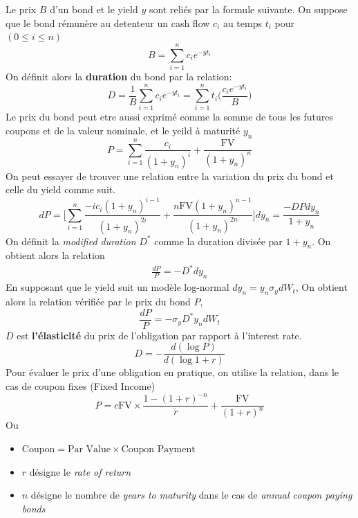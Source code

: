 \documentclass[a4paper]{article}
\begin{document}
Le prix $B$ d'un bond et le yield $y$ sont reliés par la formule suivante. On suppose que le bond rémunère au detenteur un cash flow $c_i$ au temps $t_i$ pour $(0\leq i\leq n)$
\begin{equation}
    B = \sum_{i=1}^{n} c_i e^{-yt_i}
\end{equation}
On définit alors la \textbf{duration} du bond par la relation:
\begin{equation}
    D = \frac{1}{B} \sum_{i=1}^{n} c_i e^{-y t_i} = \sum_{i=1}^{n} t_i \bigg( \frac{ c_i e^{-y t_i} }{B}\bigg)
\end{equation}
Le prix du bond peut etre aussi exprimé comme la somme de tous les futures coupons et de la valeur nominale, et le yeild à maturité $y_n$
\begin{equation}
    P = \sum_{i=1}^{n} \frac{c_i}{(1+y_n)^i}+\frac{\text{FV}}{(1+y_n)^n}
\end{equation}
On peut essayer de trouver une relation entre la variation du prix du bond et celle du yield comme suit.
\begin{equation}
    dP = \bigg[ \sum_{i=1}^{n} \frac{-ic_i(1+y_n)^{i-1}}{(1+y_n)^{2i}}+\frac{n \text{FV}(1+y_n)^{n-1}}{(1+y_n)^{2n}} \bigg]dy_n = \frac{-D P dy_n}{1+y_n}
\end{equation}
On définit la \textit{modified duration} $D^*$ comme la duration divisée par $1+y_n$. On obtient alors la relation 
\begin{align*}
    \frac{dP}{P} = -D^* dy_n
\end{align*}
En supposant que le yield suit un modèle log-normal $dy_n = y_n \sigma_y dW_t$, On obtient alors la relation vérifiée par le prix du bond $P$,
\begin{equation*}
    \frac{dP}{P} = - \sigma_y D^* y_n dW_t
\end{equation*}
$D$ est \textbf{l'élasticité} du prix de l'obligation par rapport à l'interest rate.
\begin{equation*}
    D = -\frac{d(\log P)}{d(\log 1+r)}
\end{equation*}
Pour évaluer le prix d'une obligation en pratique, on utilise la relation, dans le cas de coupon fixes (Fixed Income)
\begin{equation}
    \boxed{P = c \text{FV} \times \frac{1-(1+r)^{-n}}{r} + \frac{\text{FV}}{(1+r)^n}}
\end{equation}
Ou
\begin{itemize}
    \item $\text{Coupon} = \text{Par Value} \times \text{Coupon Payment}$
    \item $r$ désigne le \textit{rate of return}
    \item $n$ désigne le nombre de \textit{years to maturity} dans le cas de \textit{annual coupon paying bonds}
\end{itemize}
\end{document}

